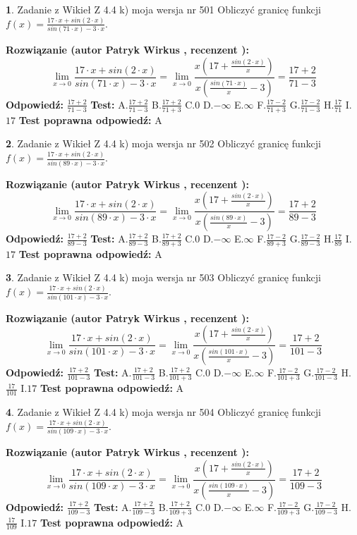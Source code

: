 \documentclass[12pt, a4paper]{article}
\theoremstyle{definition} %
\newtheorem{zad}{}
\newcommand{\zadStart}[1]{\begin{zad}#1\newline}
\newcommand{\zadStop}{\end{zad}}
\newcommand{\rozwStart}[2]{\noindent \textbf{Rozwiązanie (autor #1 , recenzent #2): }\newline}
\newcommand{\rozwStop}{\newline}
\newcommand{\odpStart}{\noindent \textbf{Odpowiedź:}\newline}
\newcommand{\odpStop}{\newline}
\newcommand{\testStart}{\noindent \textbf{Test:}\newline}
\newcommand{\testStop}{\newline}
\newcommand{\kluczStart}{\noindent \textbf{Test poprawna odpowiedź:}\newline}
\newcommand{\kluczStop}{\newline}
\begin{document}
\zadStart{Zadanie z Wikieł Z 4.4 k) moja wersja nr 501}
Obliczyć granicę funkcji $f(x)=\frac{17\cdot x +sin(2\cdot x)}{sin(71\cdot x) -3\cdot x}$.
\zadStop
\rozwStart{Patryk Wirkus}{}
$$\lim\limits_{x\to 0}\frac{17\cdot x +sin(2\cdot x)}{sin(71\cdot x) -3\cdot x}
=\lim\limits_{x\to 0}\frac{x(17+\frac{sin(2\cdot x)}{x})}{x(\frac{sin(71\cdot x)}{x}-3)}
=\frac{17+2}{71-3}$$
\rozwStop
\odpStart
$\frac{17+2}{71-3}$
\odpStop
\testStart
A.$\frac{17+2}{71-3}$
B.$\frac{17+2}{71+3}$
C.$0$
D.$-\infty$
E.$\infty$
F.$\frac{17-2}{71+3}$
G.$\frac{17-2}{71-3}$
H.$\frac{17}{71}$
I.$17$
\testStop
\kluczStart
A
\kluczStop



\zadStart{Zadanie z Wikieł Z 4.4 k) moja wersja nr 502}
Obliczyć granicę funkcji $f(x)=\frac{17\cdot x +sin(2\cdot x)}{sin(89\cdot x) -3\cdot x}$.
\zadStop
\rozwStart{Patryk Wirkus}{}
$$\lim\limits_{x\to 0}\frac{17\cdot x +sin(2\cdot x)}{sin(89\cdot x) -3\cdot x}
=\lim\limits_{x\to 0}\frac{x(17+\frac{sin(2\cdot x)}{x})}{x(\frac{sin(89\cdot x)}{x}-3)}
=\frac{17+2}{89-3}$$
\rozwStop
\odpStart
$\frac{17+2}{89-3}$
\odpStop
\testStart
A.$\frac{17+2}{89-3}$
B.$\frac{17+2}{89+3}$
C.$0$
D.$-\infty$
E.$\infty$
F.$\frac{17-2}{89+3}$
G.$\frac{17-2}{89-3}$
H.$\frac{17}{89}$
I.$17$
\testStop
\kluczStart
A
\kluczStop



\zadStart{Zadanie z Wikieł Z 4.4 k) moja wersja nr 503}
Obliczyć granicę funkcji $f(x)=\frac{17\cdot x +sin(2\cdot x)}{sin(101\cdot x) -3\cdot x}$.
\zadStop
\rozwStart{Patryk Wirkus}{}
$$\lim\limits_{x\to 0}\frac{17\cdot x +sin(2\cdot x)}{sin(101\cdot x) -3\cdot x}
=\lim\limits_{x\to 0}\frac{x(17+\frac{sin(2\cdot x)}{x})}{x(\frac{sin(101\cdot x)}{x}-3)}
=\frac{17+2}{101-3}$$
\rozwStop
\odpStart
$\frac{17+2}{101-3}$
\odpStop
\testStart
A.$\frac{17+2}{101-3}$
B.$\frac{17+2}{101+3}$
C.$0$
D.$-\infty$
E.$\infty$
F.$\frac{17-2}{101+3}$
G.$\frac{17-2}{101-3}$
H.$\frac{17}{101}$
I.$17$
\testStop
\kluczStart
A
\kluczStop



\zadStart{Zadanie z Wikieł Z 4.4 k) moja wersja nr 504}
Obliczyć granicę funkcji $f(x)=\frac{17\cdot x +sin(2\cdot x)}{sin(109\cdot x) -3\cdot x}$.
\zadStop
\rozwStart{Patryk Wirkus}{}
$$\lim\limits_{x\to 0}\frac{17\cdot x +sin(2\cdot x)}{sin(109\cdot x) -3\cdot x}
=\lim\limits_{x\to 0}\frac{x(17+\frac{sin(2\cdot x)}{x})}{x(\frac{sin(109\cdot x)}{x}-3)}
=\frac{17+2}{109-3}$$
\rozwStop
\odpStart
$\frac{17+2}{109-3}$
\odpStop
\testStart
A.$\frac{17+2}{109-3}$
B.$\frac{17+2}{109+3}$
C.$0$
D.$-\infty$
E.$\infty$
F.$\frac{17-2}{109+3}$
G.$\frac{17-2}{109-3}$
H.$\frac{17}{109}$
I.$17$
\testStop
\kluczStart
A
\kluczStop
\end{document}
